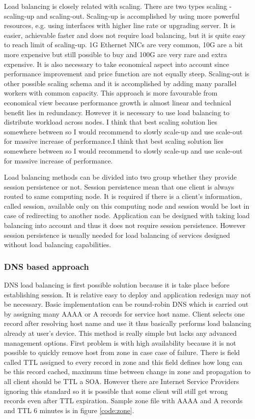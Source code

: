 Load balancing is closely related with scaling. There are two types scaling - scaling-up and scaling-out. Scaling-up is accomplished by using more powerful resources, e.g. using interfaces with higher line rate or upgrading server. It is easier, achievable faster and does not require load balancing, but it is quite easy to reach limit of scaling-up. 1G Ethernet \Ac{NIC}s are very common, 10G are a bit more expensive but still possible to buy and 100G are very rare and extra expensive. It is also necessary to take economical aspect into account since performance improvement and price function are not equally steep. Scaling-out is other possible scaling schema and it is accomplished by adding many parallel workers with common capacity. This approach is more favourable from economical view because performance growth is almost linear and technical benefit lies in redundancy. However it is necessary to use load balancing to distribute workload across nodes. I think that best scaling solution lies somewhere between so I would recommend to slowly scale-up and use scale-out for massive increase of performance.I think that best scaling solution lies somewhere between so I would recommend to slowly scale-up and use scale-out for massive increase of performance.

Load balancing methods can be divided into two group whether they provide session persistence or not. Session persistence mean that one client is always routed to same computing node. It is required if there is a client's information, called session, available only on this computing node and session would be lost in case of redirecting to another node. Application can be designed with taking load balancing into account and thus it does not require session persistence. However session persistence is usually needed for load balancing of services designed without load balancing capabilities.

\subsubsection{DNS based approach}
\Ac{DNS} load balancing is first possible solution because it is take place before establishing session. It is relative easy to deploy and application redesign may not be necessary. Basic implementation can be round-robin \Ac{DNS} which is carried out by assigning many AAAA or A records for service host name. Client selects one record after resolving host name and use it thus basically performs load balancing already at user's device. This method is really simple but lacks any advanced management options. First problem is with high availability because it is not possible to quickly remove host from zone in case case of failure. There is field called \Ac{TTL} assigned to every record in zone and this field defines how long can be this record cached, maximum time between change in zone and propagation to all client should be \Ac{TTL} a \Ac{SOA}. However there are Internet Service Providers ignoring this standard so it is possible that some client will still get wrong records even after \Ac{TTL} expiration. Sample zone file with AAAA and A records and \Ac{TTL} 6 minutes is in figure \ref{code:zone}.

